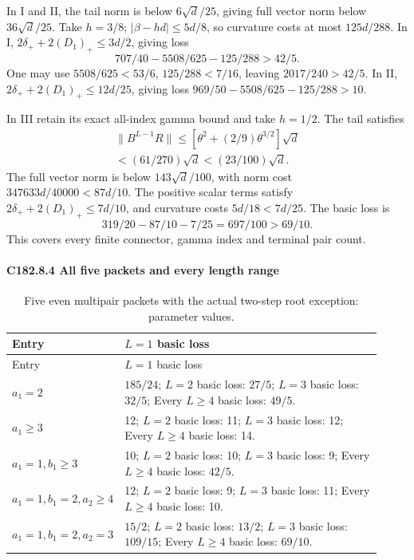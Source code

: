 In I and II, the tail norm is below \(6\sqrt d/25\), giving full vector norm below \(36\sqrt d/25\). Take \(h=3/8\); \(|\beta-hd|\le5d/8\), so curvature costs at most \(125d/288\). In I, \(2\delta_++2(D_1)_+\le3d/2\), giving loss
\[
 707/40-5508/625-125/288>42/5.                      \tag{C182.45}
\]
One may use \(5508/625<53/6\), \(125/288<7/16\), leaving \(2017/240>42/5\). In II, \(2\delta_++2(D_1)_+\le12d/25\), giving loss \(969/50-5508/625-125/288>10\).

In III retain its exact all-index gamma bound and take \(h=1/2\). The tail satisfies
\[
\begin{gathered}
\|B^{L-1}R\|\le[\theta^2+(2/9)\theta^{3/2}]\sqrt d\\
<(61/270)\sqrt d<(23/100)\sqrt d.
\end{gathered}
\]
The full vector norm is below \(143\sqrt d/100\), with norm cost \(347633d/40000<87d/10\). The positive scalar terms satisfy \(2\delta_++2(D_1)_+\le7d/10\), and curvature costs \(5d/18<7d/25\). The basic loss is
\[
 319/20-87/10-7/25=697/100>69/10.                   \tag{C182.46}
\]
This covers every finite connector, gamma index and terminal pair count.

\paragraph{C182.8.4 All five packets and every length range}


\begingroup\small
\setlength{\tabcolsep}{3pt}
\setlength{\LTleft}{0pt}\setlength{\LTright}{\fill}
\begin{longtable}{@{}p{0.2200\linewidth}p{0.7000\linewidth}@{}}
\caption{Five even multipair packets with the actual two-step root exception: parameter values.}\label{tab:parameters:q5-c182:1}\\
\toprule
Entry & \(L=1\) basic loss \\
\midrule\endfirsthead
\toprule
Entry & \(L=1\) basic loss \\
\midrule\endhead
\bottomrule\endfoot
\(a_1=2\) & \(185/24\); \(L=2\) basic loss: \(27/5\); \(L=3\) basic loss: \(32/5\); Every \(L\ge 4\) basic loss: \(49/5\). \\
\addlinespace[2pt]
\(a_1\ge 3\) & 12; \(L=2\) basic loss: 11; \(L=3\) basic loss: 12; Every \(L\ge 4\) basic loss: 14. \\
\addlinespace[2pt]
\(a_1=1,\allowbreak b_1\ge 3\) & 10; \(L=2\) basic loss: 10; \(L=3\) basic loss: 9; Every \(L\ge 4\) basic loss: \(42/5\). \\
\addlinespace[2pt]
\(a_1=1,\allowbreak b_1=2,\allowbreak a_2\ge 4\) & 12; \(L=2\) basic loss: 9; \(L=3\) basic loss: 11; Every \(L\ge 4\) basic loss: 10. \\
\addlinespace[2pt]
\(a_1=1,\allowbreak b_1=2,\allowbreak a_2=3\) & \(15/2\); \(L=2\) basic loss: \(13/2\); \(L=3\) basic loss: \(109/15\); Every \(L\ge 4\) basic loss: \(69/10\). \\
\end{longtable}
\endgroup


